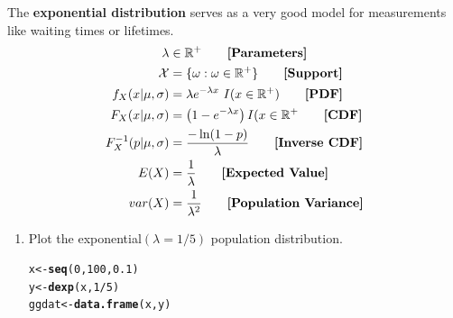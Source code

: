 \documentclass{article}\usepackage[]{graphicx}\usepackage[]{color}
\makeatletter
\newcommand{\hlnum}[1]{\textcolor[rgb]{0.686,0.059,0.569}{#1}}%
\newcommand{\hlopt}[1]{\textcolor[rgb]{0,0,0}{#1}}%
\newcommand{\hlstd}[1]{\textcolor[rgb]{0.345,0.345,0.345}{#1}}%
\newcommand{\hlkwb}[1]{\textcolor[rgb]{0.69,0.353,0.396}{#1}}%
\newcommand{\hlkwd}[1]{\textcolor[rgb]{0.737,0.353,0.396}{\textbf{#1}}}%
\newenvironment{kframe}{%
 \def\at@end@of@kframe{}%
 \ifinner\ifhmode%
  \def\at@end@of@kframe{\end{minipage}}%
  \begin{minipage}{\columnwidth}%
 \fi\fi%
 \def\FrameCommand##1{\hskip\@totalleftmargin \hskip-\fboxsep
 \colorbox{shadecolor}{##1}\hskip-\fboxsep
     \hskip-\linewidth \hskip-\@totalleftmargin \hskip\columnwidth}%
 \MakeFramed {\advance\hsize-\width
   \@totalleftmargin\z@ \linewidth\hsize
   \@setminipage}}%
 {\par\unskip\endMakeFramed%
 \at@end@of@kframe}
\newenvironment{knitrout}{}{} %
\makeatother
\begin{document}
\begin{enumerate}
  The \textbf{exponential distribution} serves as a very good model for measurements like waiting times or lifetimes.
  \begin{align*}
  \lambda &\in \mathbb{R^+}  \tag*{\textbf{[Parameters]}}\\
  \mathcal{X}&= \{\omega: \omega \in \mathbb{R^+}\} \tag*{\textbf{[Support]}}\\
  f_X(x|\mu,\sigma) &= \lambda e^{-\lambda x}~ I(x \in \mathbb{R^+}) \tag*{\textbf{[PDF]}}\\
  F_X(x|\mu,\sigma) &= \left(1- e^{-\lambda x}\right)I(x \in \mathbb{R^+}\tag*{\textbf{[CDF]}}\\
  F_X^{-1}(p|\mu,\sigma) &= \frac{-\ln(1-p)}{\lambda} \tag*{\textbf{[Inverse CDF]}}\\
  E(X) &= \frac{1}{\lambda} \tag*{\textbf{[Expected Value]}}\\
  var(X) &= \frac{1}{\lambda^2}\tag*{\textbf{[Population Variance]}}\\
  \end{align*}
	\begin{enumerate}
	  \item Plot the exponential$(\lambda = 1/5)$ population distribution.
\begin{knitrout}
\color{fgcolor}\begin{kframe}
\begin{alltt}
\hlstd{x}\hlkwb{<-}\hlkwd{seq}\hlstd{(}\hlnum{0}\hlstd{,} \hlnum{100}\hlstd{,} \hlnum{0.1}\hlstd{)}
\hlstd{y}\hlkwb{<-}\hlkwd{dexp}\hlstd{(x,} \hlnum{1}\hlopt{/}\hlnum{5}\hlstd{)}
\hlstd{ggdat}\hlkwb{<-}\hlkwd{data.frame}\hlstd{(x,y)}


\end{alltt}
\end{kframe}
\end{knitrout}
\end{enumerate}
\end{enumerate}
\end{document}

